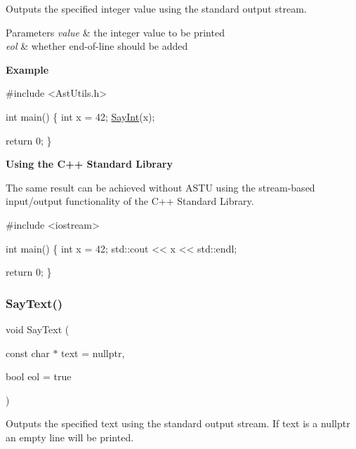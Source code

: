 Outputs the specified integer value using the standard output stream.


\begin{DoxyParams}{Parameters}
{\em value} & the integer value to be printed \\
\hline
{\em eol} & whether \textquotesingle{}end-\/of-\/line\textquotesingle{} should be added\\
\hline
\end{DoxyParams}
{\bfseries Example}


\begin{DoxyCode}
\textcolor{preprocessor}{#include <AstUtils.h>}

\textcolor{keywordtype}{int} main()
\{
  \textcolor{keywordtype}{int} x = 42;
  \hyperlink{group__io__group_gaa78da65e44d9ab5e70c79ed77f62b86a}{SayInt}(x);

  \textcolor{keywordflow}{return} 0;
\}
\end{DoxyCode}


{\bfseries Using the C++ Standard Library}

The same result can be achieved without A\+S\+TU using the stream-\/based input/output functionality of the C++ Standard Library.


\begin{DoxyCode}
\textcolor{preprocessor}{#include <iostream>}

\textcolor{keywordtype}{int} main()
\{
  \textcolor{keywordtype}{int} x = 42;
  std::cout << x << std::endl;

  \textcolor{keywordflow}{return} 0;
\}
\end{DoxyCode}
 \mbox{\label{group__io__group_ga82cdf45375c3b92b2a60c3d9b55d682f}} 
\subsubsection{\texorpdfstring{Say\+Text()}{SayText()}}
{\footnotesize\ttfamily void Say\+Text (\begin{DoxyParamCaption}\item[{const char $\ast$}]{text = {\ttfamily nullptr},  }\item[{bool}]{eol = {\ttfamily true} }\end{DoxyParamCaption})}

Outputs the specified text using the standard output stream. If {\ttfamily text} is a {\ttfamily nullptr} an empty line will be printed.


